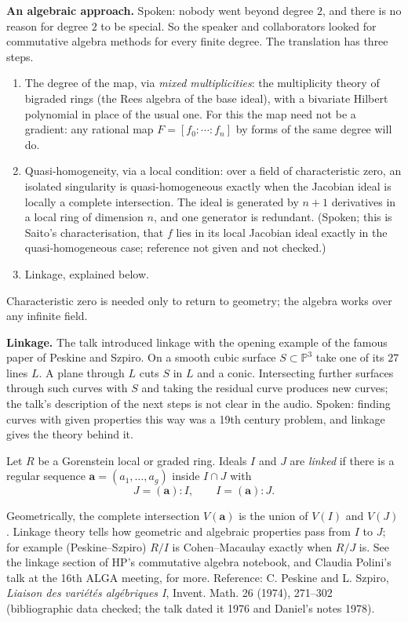 \medskip\noindent
{\bf An algebraic approach.} Spoken: nobody
went beyond degree $2$, and there is no
reason for degree $2$ to be special. So the
speaker and collaborators looked for
commutative algebra methods for every finite
degree. The translation has three steps.
\begin{enumerate}
\item The degree of the map, via
\emph{mixed multiplicities}: the
multiplicity theory of bigraded rings (the
Rees algebra of the base ideal), with a
bivariate Hilbert polynomial in place of the
usual one. For this the map need not be a
gradient: any rational map
$F = [f_0 : \cdots : f_n]$ by forms of the
same degree will do.
\item Quasi-homogeneity, via a local
condition: over a field of characteristic
zero, an isolated singularity is
quasi-homogeneous exactly when the Jacobian
ideal is locally a complete intersection.
The ideal is generated by $n+1$ derivatives
in a local ring of dimension $n$, and one
generator is redundant. (Spoken; this is
Saito's characterisation, that $f$ lies in
its local Jacobian ideal exactly in the
quasi-homogeneous case; reference not given
and not checked.)
\item Linkage, explained below.
\end{enumerate}
Characteristic zero is needed only to return
to geometry; the algebra works over any
infinite field.

\medskip\noindent
{\bf Linkage.} The talk introduced linkage
with the opening example of the famous paper
of Peskine and Szpiro. On a smooth cubic
surface $S \subset \mathbb{P}^3$ take one of
its $27$ lines $L$. A plane through $L$ cuts
$S$ in $L$ and a conic. Intersecting further
surfaces through such curves with $S$ and
taking the residual curve produces new
curves; the talk's description of the next
steps is not clear in the audio. Spoken:
finding curves with given properties this
way was a 19th century problem, and linkage
gives the theory behind it.

\begin{definition}
\label{definition-linkage-hamid}
Let $R$ be a Gorenstein local or graded ring.
Ideals $I$ and $J$ are \emph{linked} if there
is a regular sequence
$\mathbf{a} = (a_1, \ldots, a_g)$ inside
$I \cap J$ with
$$
J = (\mathbf{a}) : I,
\qquad
I = (\mathbf{a}) : J.
$$
\end{definition}

\noindent
Geometrically, the complete intersection
$V(\mathbf{a})$ is the union of $V(I)$ and
$V(J)$. Linkage theory tells how geometric
and algebraic properties pass from $I$ to
$J$; for example (Peskine--Szpiro) $R/I$ is
Cohen--Macaulay exactly when $R/J$ is. See
the linkage section of HP's commutative
algebra notebook, and Claudia Polini's talk
at the 16th ALGA meeting, for more.
Reference: C. Peskine and L. Szpiro,
\emph{Liaison des vari\'et\'es alg\'ebriques
I}, Invent. Math. 26 (1974), 271--302
(bibliographic data checked; the talk dated
it 1976 and Daniel's notes 1978).

